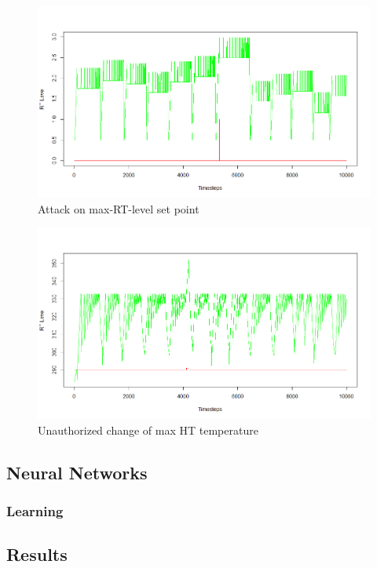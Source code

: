 \begin{figure}[h]
	\centering
	\includegraphics[scale=0.5]{Figures/anomaly_max_RT_level}
	\decoRule
	\caption[Attack on max-RT-level set point]{Attack on max-RT-level set point \parencite{Own}}
	\label{fig:anomaly_max_RT_level}
\end{figure}

\begin{figure}[h]
	\centering
	\includegraphics[scale=0.5]{Figures/anomaly_max_HT_temp}
	\decoRule
	\caption[Unauthorized change of max HT temperature]{Unauthorized change of max HT temperature \parencite{Own}}
	\label{fig:anomaly_max_HT_temp}
\end{figure}


\subsection{Neural Networks}



\subsubsection{Learning}


\subsection{Results}






